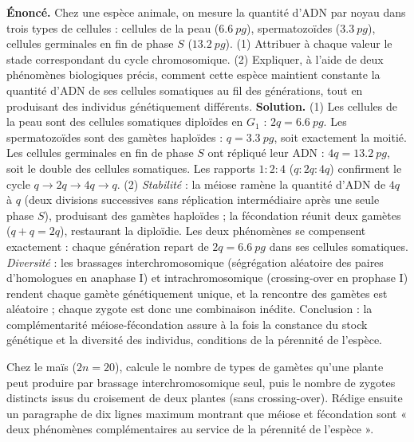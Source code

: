 \documentclass[11pt]{article}
\begin{document}
\begin{exoresolu}
\textbf{Énoncé.} Chez une espèce animale, on mesure la quantité d'ADN par noyau dans trois types de cellules : cellules de la peau ($\SI{6,6}{pg}$), spermatozoïdes ($\SI{3,3}{pg}$), cellules germinales en fin de phase $S$ ($\SI{13,2}{pg}$). (1) Attribuer à chaque valeur le stade correspondant du cycle chromosomique. (2) Expliquer, à l'aide de deux phénomènes biologiques précis, comment cette espèce maintient constante la quantité d'ADN de ses cellules somatiques au fil des générations, tout en produisant des individus génétiquement différents.
\tcblower
\textbf{Solution.} (1) Les cellules de la peau sont des cellules somatiques diploïdes en $G_1$ : $2q = \SI{6,6}{pg}$. Les spermatozoïdes sont des gamètes haploïdes : $q = \SI{3,3}{pg}$, soit exactement la moitié. Les cellules germinales en fin de phase $S$ ont répliqué leur ADN : $4q = \SI{13,2}{pg}$, soit le double des cellules somatiques. Les rapports $1:2:4$ ($q:2q:4q$) confirment le cycle $q \rightarrow 2q \rightarrow 4q \rightarrow q$.
(2) \emph{Stabilité} : la méiose ramène la quantité d'ADN de $4q$ à $q$ (deux divisions successives sans réplication intermédiaire après une seule phase $S$), produisant des gamètes haploïdes ; la fécondation réunit deux gamètes ($q + q = 2q$), restaurant la diploïdie. Les deux phénomènes se compensent exactement : chaque génération repart de $2q = \SI{6,6}{pg}$ dans ses cellules somatiques. \emph{Diversité} : les brassages interchromosomique (ségrégation aléatoire des paires d'homologues en anaphase I) et intrachromosomique (crossing-over en prophase I) rendent chaque gamète génétiquement unique, et la rencontre des gamètes est aléatoire ; chaque zygote est donc une combinaison inédite. Conclusion : la complémentarité méiose-fécondation assure à la fois la constance du stock génétique et la diversité des individus, conditions de la pérennité de l'espèce.
\end{exoresolu}

\begin{exercice}
Chez le maïs ($2n = 20$), calcule le nombre de types de gamètes qu'une plante peut produire par brassage interchromosomique seul, puis le nombre de zygotes distincts issus du croisement de deux plantes (sans crossing-over). Rédige ensuite un paragraphe de dix lignes maximum montrant que méiose et fécondation sont « deux phénomènes complémentaires au service de la pérennité de l'espèce ».
\end{exercice}
\end{document}
